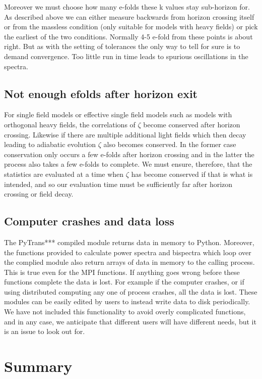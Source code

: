 \documentclass[10pt,
amsmath,amssymb,
aps,prd,nofootinbib,eqsecnum,a4paper]{revtex4}
\begin{document}
Moreover we must choose how many e-folds these k values stay sub-horizon for. As described above we can either 
measure backwards from horizon crossing itself or from the massless condition (only suitable for models with heavy fields) or pick 
the earliest of the two conditions. 
Normally 4-5 e-fold from these points is about right. But as with the 
setting of tolerances the only way to tell for sure is to demand convergence. Too little run in 
time leads to spurious oscillations in the spectra.

\subsection{Not enough efolds after horizon exit}

For single field models or effective single field models such as models with orthogonal heavy fields, the correlations of 
$\zeta$ become conserved after horizon crossing. Likewise if there are multiple additional light 
fields which then decay leading to 
adiabatic evolution $\zeta$ also becomes conserved. In the former case conservation only 
occurs a few e-folds after 
horizon crossing and in the latter the process also takes a few e-folds to complete. 
We must ensure, therefore, that the statistics are 
evaluated at a time when $\zeta$ has become conserved if that is what is intended, and so our evaluation time 
must be sufficiently far after horizon crossing or field decay.

\subsection{Computer crashes and data loss}

The { PyTrans***} compiled module returns data in memory to Python. Moreover, the functions provided 
to calculate power spectra and bispectra which loop over the complied module also return 
arrays of data in memory to the calling process. This is true even for the MPI functions. If anything goes wrong before these functions complete the data is lost. For example if the computer crashes, or if using distributed computing any 
one of process crashes, all the data is lost. These modules can be easily edited by users to instead write data to disk 
periodically. We have not 
included this functionality to avoid overly complicated functions, and in any case, we anticipate that 
different users will have different needs, but it is an issue to look out for.


\section{Summary}
\end{document}
